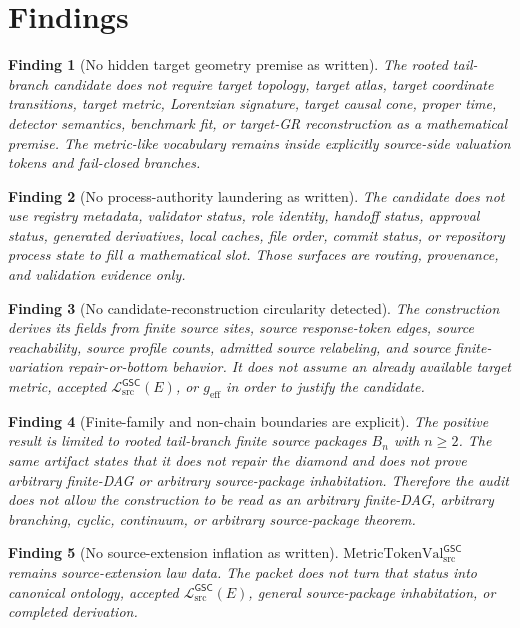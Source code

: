 \documentclass[11pt]{article}
\newcommand{\MetricTokenVal}{\mathrm{MetricTokenVal}_{\mathrm{src}}^{\mathsf{GSC}}}
\newcommand{\MetricData}{\mathcal{L}_{\mathrm{src}}^{\mathsf{GSC}}}
\newcommand{\geff}{g_{\mathrm{eff}}}
\newcommand{\Bn}{B_n}
\newtheorem{finding}{Finding}
\begin{document}
\section{Findings}

\begin{finding}[No hidden target geometry premise as written]
The rooted tail-branch candidate does not require target topology, target
atlas, target coordinate transitions, target metric, Lorentzian signature,
target causal cone, proper time, detector semantics, benchmark fit, or
target-GR reconstruction as a mathematical premise. The metric-like vocabulary
remains inside explicitly source-side valuation tokens and fail-closed
branches.
\end{finding}

\begin{finding}[No process-authority laundering as written]
The candidate does not use registry metadata, validator status, role identity,
handoff status, approval status, generated derivatives, local caches, file
order, commit status, or repository process state to fill a mathematical
slot. Those surfaces are routing, provenance, and validation evidence only.
\end{finding}

\begin{finding}[No candidate-reconstruction circularity detected]
The construction derives its fields from finite source sites, source
response-token edges, source reachability, source profile counts, admitted
source relabeling, and source finite-variation repair-or-bottom behavior. It
does not assume an already available target metric, accepted
\(\MetricData(E)\), or \(\geff\) in order to justify the candidate.
\end{finding}

\begin{finding}[Finite-family and non-chain boundaries are explicit]
The positive result is limited to rooted tail-branch finite source packages
\(\Bn\) with \(n\ge 2\). The same artifact states that it does not repair the
diamond and does not prove arbitrary finite-DAG or arbitrary source-package
inhabitation. Therefore the audit does not allow the construction to be read
as an arbitrary finite-DAG, arbitrary branching, cyclic, continuum, or
arbitrary source-package theorem.
\end{finding}

\begin{finding}[No source-extension inflation as written]
\(\MetricTokenVal\) remains source-extension law data. The packet does not
turn that status into canonical ontology, accepted \(\MetricData(E)\),
general source-package inhabitation, or completed derivation.
\end{finding}
\end{document}
